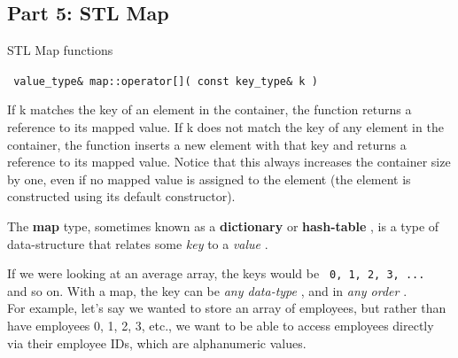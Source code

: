 \documentclass[a4paper,12pt]{book}
\begin{document}
            \newpage
            \subsection*{Part 5: STL Map}

                \begin{intro}{STL Map functions}

                    \footnotesize
                    
                    \texttt{ value\_type\& map::operator[]( const key\_type\& k ) }

                        If k matches the key of an element in the container,
                        the function returns a reference to its mapped value.
                        If k does not match the key of any element in the container,
                        the function inserts a new element with that key and returns a
                        reference to its mapped value. Notice that this always increases the container
                        size by one, even if no mapped value is assigned to the element
                        (the element is constructed using its default constructor).
                    

                    
                \end{intro}

                    The \textbf{ map } type, sometimes known as a \textbf{ dictionary }
                    or \textbf{ hash-table }, is a type of data-structure that relates
                    some \textit{ key } to a \textit{ value }.

                    If we were looking at an average array, the keys would be
                    \texttt{ 0, 1, 2, 3, ... } and so on.
                    With a map, the key can be \textit{ any data-type },
                    and in \textit{ any order }. \\

                    For example, let's say we wanted to store an array of
                    employees, but rather than have employees 0, 1, 2, 3, etc.,
                    we want to be able to access employees directly via their
                    employee IDs, which are alphanumeric values. \\
\end{document}
